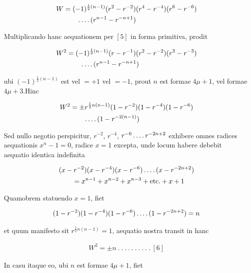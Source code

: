 %
\[
\begin{aligned}
W&=(-1)^{\frac12(n-1)}(r^2-r^{-2})(r^4-r^{-4})(r^6-r^{-6})\\&\qquad\mathinner{.\,.\,.\,.}(r^{n-1}-r^{-n+1})
\end{aligned}
\]

Multiplicando hanc aequationem per $[5]$ in forma primitiva, prodit

\[
\begin{aligned}
W^2&=(-1)^{\frac12(n-1)}(r-r^{-1})(r^2-r^{-2})(r^3-r^{-3})\\&\qquad\mathinner{.\,.\,.\,.}(r^{n-1}-r^{-n+1})
\end{aligned}
\]

ubi $(-1)^{\frac12(n-1)}$ est vel $=+1$ vel $=-1$, prout $n$ est formae $4\mu+1$, vel formae $4\mu+3$.\quad Hinc

\[
\begin{aligned}
W^2&=\pm r^{\frac12n(n-1)}(1-r^{-2})(1-r^{-4})(1-r^{-6})\\&\qquad\mathinner{.\,.\,.\,.}(1-r^{-2(n-1)})
\end{aligned}
\]

Sed nullo negotio perspicitur, $r^{-2}$, $r^{-4}$, $r^{-6}\mathinner{.\,.\,.\,.} r^{-2n+2}$ exhibere omnes radices aequationis $x^n-1=0$, radice $x=1$ excepta, unde locum habere debebit aequatio identica indefinita

\[
\begin{aligned}
&(x-r^{-2})(x-r^{-4})(x-r^{-6})\mathinner{.\,.\,.\,.}(x-r^{-2n+2})\\&\qquad=x^{n-1}+x^{n-2}+x^{n-3}+\text{etc.}+x+1
\end{aligned}
\]

Quamobrem statuendo $x=1$, fiet

\[
\begin{aligned}
(1-r^{-2})(1-r^{-4})(1-r^{-6})\mathinner{.\,.\,.\,.}(1-r^{-2n+2})=n
\end{aligned}
\]

et quum manifesto sit $r^{\frac12n(n-1)}=1$, aequatio nostra transit in hanc

\[
\begin{aligned}
W^2=\pm n\  .\  .\  .\  .\  .\  .\  .\  .\  .\  .\ [6]
\end{aligned}
\]

In casu itaque eo, ubi $n$ est formae $4\mu+1$, fiet

